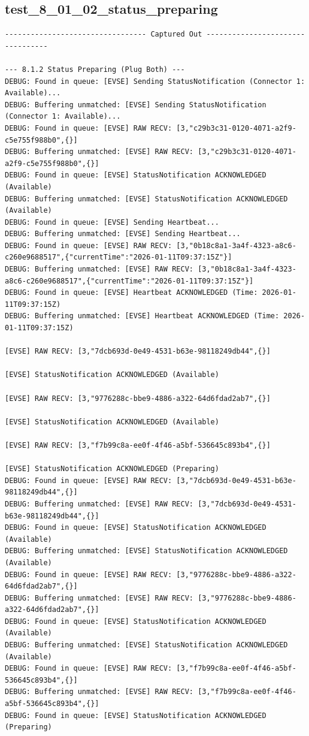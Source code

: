 \documentclass{article}
\begin{document}
\subsection*{test\_8\_01\_02\_status\_preparing}
\begin{lstlisting}
--------------------------------- Captured Out ---------------------------------

--- 8.1.2 Status Preparing (Plug Both) ---
DEBUG: Found in queue: [EVSE] Sending StatusNotification (Connector 1: Available)...
DEBUG: Buffering unmatched: [EVSE] Sending StatusNotification (Connector 1: Available)...
DEBUG: Found in queue: [EVSE] RAW RECV: [3,"c29b3c31-0120-4071-a2f9-c5e755f988b0",{}]
DEBUG: Buffering unmatched: [EVSE] RAW RECV: [3,"c29b3c31-0120-4071-a2f9-c5e755f988b0",{}]
DEBUG: Found in queue: [EVSE] StatusNotification ACKNOWLEDGED (Available)
DEBUG: Buffering unmatched: [EVSE] StatusNotification ACKNOWLEDGED (Available)
DEBUG: Found in queue: [EVSE] Sending Heartbeat...
DEBUG: Buffering unmatched: [EVSE] Sending Heartbeat...
DEBUG: Found in queue: [EVSE] RAW RECV: [3,"0b18c8a1-3a4f-4323-a8c6-c260e9688517",{"currentTime":"2026-01-11T09:37:15Z"}]
DEBUG: Buffering unmatched: [EVSE] RAW RECV: [3,"0b18c8a1-3a4f-4323-a8c6-c260e9688517",{"currentTime":"2026-01-11T09:37:15Z"}]
DEBUG: Found in queue: [EVSE] Heartbeat ACKNOWLEDGED (Time: 2026-01-11T09:37:15Z)
DEBUG: Buffering unmatched: [EVSE] Heartbeat ACKNOWLEDGED (Time: 2026-01-11T09:37:15Z)

[EVSE] RAW RECV: [3,"7dcb693d-0e49-4531-b63e-98118249db44",{}]

[EVSE] StatusNotification ACKNOWLEDGED (Available)

[EVSE] RAW RECV: [3,"9776288c-bbe9-4886-a322-64d6fdad2ab7",{}]

[EVSE] StatusNotification ACKNOWLEDGED (Available)

[EVSE] RAW RECV: [3,"f7b99c8a-ee0f-4f46-a5bf-536645c893b4",{}]

[EVSE] StatusNotification ACKNOWLEDGED (Preparing)
DEBUG: Found in queue: [EVSE] RAW RECV: [3,"7dcb693d-0e49-4531-b63e-98118249db44",{}]
DEBUG: Buffering unmatched: [EVSE] RAW RECV: [3,"7dcb693d-0e49-4531-b63e-98118249db44",{}]
DEBUG: Found in queue: [EVSE] StatusNotification ACKNOWLEDGED (Available)
DEBUG: Buffering unmatched: [EVSE] StatusNotification ACKNOWLEDGED (Available)
DEBUG: Found in queue: [EVSE] RAW RECV: [3,"9776288c-bbe9-4886-a322-64d6fdad2ab7",{}]
DEBUG: Buffering unmatched: [EVSE] RAW RECV: [3,"9776288c-bbe9-4886-a322-64d6fdad2ab7",{}]
DEBUG: Found in queue: [EVSE] StatusNotification ACKNOWLEDGED (Available)
DEBUG: Buffering unmatched: [EVSE] StatusNotification ACKNOWLEDGED (Available)
DEBUG: Found in queue: [EVSE] RAW RECV: [3,"f7b99c8a-ee0f-4f46-a5bf-536645c893b4",{}]
DEBUG: Buffering unmatched: [EVSE] RAW RECV: [3,"f7b99c8a-ee0f-4f46-a5bf-536645c893b4",{}]
DEBUG: Found in queue: [EVSE] StatusNotification ACKNOWLEDGED (Preparing)
\end{lstlisting}
\end{document}
